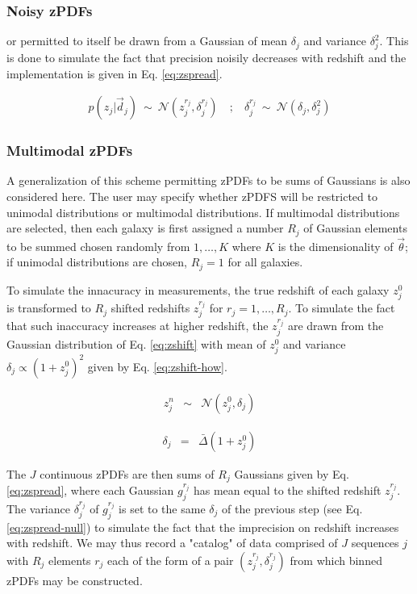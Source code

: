 \documentclass[preprint]{aastex}
\begin{document}
\clearpage
\subsubsection{Noisy zPDFs}
\label{sec:noisypz}

or permitted to itself be drawn from a Gaussian of mean $\delta_{j}$ and variance $\delta_{j}^{2}$.  This is done to simulate the fact that precision noisily decreases with redshift and the implementation is given in Eq. \ref{eq:zspread}.  

\begin{eqnarray}
\label{eq:zspread-how}
p(z_{j}|\vec{d}_{j})\ \sim\ \mathcal{N}(z^{r_{j}}_{j},\delta^{r_{j}}_{j})\ &;&\ \delta^{r_{j}}_{j}\ \sim\ \mathcal{N}(\delta_{j},\delta_{j}^{2})
\end{eqnarray}

\clearpage
\subsubsection{Multimodal zPDFs}
\label{sec:multi}

A generalization of this scheme permitting zPDFs to be sums of Gaussians is also considered here.  The user may specify whether zPDFS will be restricted to unimodal distributions or multimodal distributions.  If multimodal distributions are selected, then each galaxy is first assigned a number $R_{j}$ of Gaussian elements to be summed chosen randomly from $1,\dots,K$ where $K$ is the dimensionality of $\vec{\theta}$; if unimodal distributions are chosen, $R_{j}=1$ for all galaxies.  

To simulate the innacuracy in measurements, the true redshift of each galaxy $z_{j}^{0}$ is transformed to $R_{j}$ shifted redshifts $z^{r_{j}}_{j}$ for $r_{j}=1,\dots,R_{j}$.  To simulate the fact that such inaccuracy increases at higher redshift, the $z^{r_{j}}_{j}$ are drawn from the Gaussian distribution of Eq. \ref{eq:zshift} with mean of $z_{j}^{0}$ and variance $\delta_{j}\propto(1+z_{j}^{0})^{2}$ given by Eq. \ref{eq:zshift-how}.  

\begin{eqnarray}
z^{n}_{j} &\sim& \mathcal{N}(z_{j}^{0},\delta_{j})
\end{eqnarray}

\begin{eqnarray}
\label{eq:zshift-how}
\delta_{j} &=& \bar{\Delta}(1+z^{0}_{j})
\end{eqnarray}

The $J$ continuous zPDFs are then sums of $R_{j}$ Gaussians given by Eq. \ref{eq:zspread}, where each Gaussian $g_{j}^{r_{j}}$ has mean equal to the shifted redshift $z^{r_{j}}_{j}$.  The variance $\delta^{r_{j}}_{j}$ of $g_{j}^{r_{j}}$ is set to the same $\delta_{j}$ of the previous step (see Eq. \ref{eq:zspread-null}) to simulate the fact that the imprecision on redshift increases with redshift.  We may thus record a "catalog" of data comprised of $J$ sequences $j$ with $R_{j}$ elements $r_{j}$ each of the form of a pair $(z^{r_{j}}_{j},\delta^{r_{j}}_{j})$ from which binned zPDFs may be constructed.  
\end{document}
